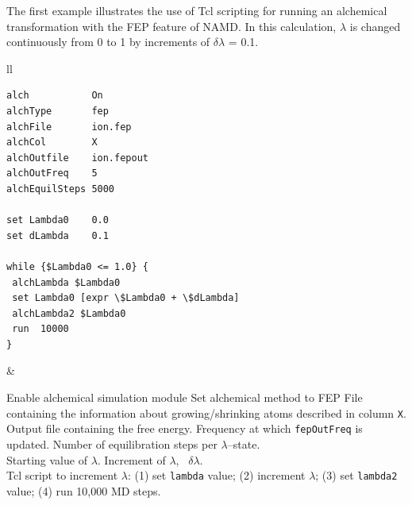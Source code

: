 The first example illustrates the use of {\sc Tcl} scripting for running
an alchemical transformation with the FEP feature of NAMD. In this
calculation, $\lambda$ is changed continuously from 0 to 1
by increments of $\delta \lambda$ = 0.1.


\begin{tabular}{ll}
\begin{minipage}{8cm}
\begin{verbatim}
alch           On
alchType       fep
alchFile       ion.fep
alchCol        X
alchOutfile    ion.fepout
alchOutFreq    5
alchEquilSteps 5000

set Lambda0    0.0
set dLambda    0.1

while {$Lambda0 <= 1.0} {
 alchLambda $Lambda0
 set Lambda0 [expr \$Lambda0 + \$dLambda]
 alchLambda2 $Lambda0
 run  10000
}
\end{verbatim}
\end{minipage}
&
\begin{minipage}{7.8cm}
Enable alchemical simulation module
\newline
Set alchemical method to FEP
\newline
File containing the information about growing/shrinking atoms
described in column {\tt X}.
\newline
Output file containing the free energy.
\newline
Frequency at which {\tt fepOutFreq} is updated.
\newline
Number of equilibration steps per $\lambda$--state.
\\[0.6cm]
Starting value of $\lambda$.
\newline
Increment of $\lambda$, \ie~$\delta \lambda$.
\\[0.6cm]
{\sc Tcl} script to increment $\lambda$:
\newline
\hspace{0.4cm} (1) set {\tt lambda} value;
\newline
\hspace{0.4cm} (2) increment $\lambda$;
\newline
\hspace{0.4cm} (3) set {\tt lambda2} value;
\newline
\hspace{0.4cm} (4) run 10,000 MD steps.
\\
\end{minipage}
\end{tabular}



